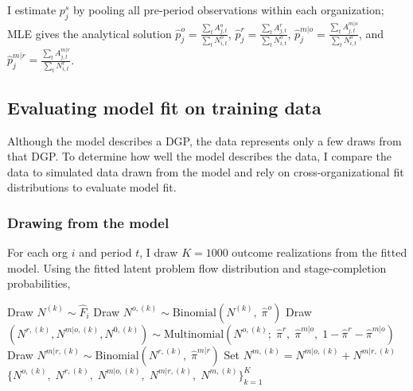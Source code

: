 \documentclass[source/paper/main.tex]{subfiles}
\begin{document}
I estimate $p_j^s$ by pooling all pre-period observations within each organization; MLE gives the analytical solution $\hat{p}_j^o = \frac{\sum_t A_{j,t}^o}{\sum_t N_{i,t}^o}$, $\hat{p}_j^r = \frac{\sum_t A_{j,t}^r}{\sum_t N_{i,t}^o}$, $\hat{p}_j^{m|o} = \frac{\sum_t A_{j,t}^{m|o}}{\sum_t N_{i,t}^o}$, and $\hat{p}_j^{m|r} = \frac{\sum_t A_{j,t}^{m|r}}{\sum_t N_{i,t}^r}$.


\subsection{Evaluating model fit on training data}

Although the model describes a DGP, the data represents only a few draws from that DGP.
To determine how well the model describes the data, I compare the data to simulated data drawn from the model and rely on cross-organizational fit distributions to evaluate model fit.


\subsubsection{Drawing from the model}

For each org $i$ and period $t$, I draw $K=1000$ outcome realizations from the fitted model.
Using the fitted latent problem flow distribution and stage-completion probabilities,

\begin{algorithm}[h]
\caption{DrawCounts($\hat{F}_i,\;\hat{\pi}^o,\;\hat{\pi}^r,\;\hat{\pi}^{m|o},\;\hat{\pi}^{m|r}$)}
\label{alg:drawcounts}
\begin{algorithmic}[1]
  \State Draw $N^{(k)} \sim \hat{F}_i$
  \State Draw $N^{o,(k)} \sim \mathrm{Binomial}(N^{(k)},\;\hat{\pi}^o)$
  \State Draw $(N^{r,(k)},N^{m|o,(k)},N^{0,(k)}) \sim \mathrm{Multinomial}(N^{o,(k)};\;\hat{\pi}^r,\;\hat{\pi}^{m|o},\;1-\hat{\pi}^r-\hat{\pi}^{m|o})$
  \State Draw $N^{m|r,(k)} \sim \mathrm{Binomial}(N^{r,(k)},\;\hat{\pi}^{m|r})$
  \State Set $N^{m,(k)} = N^{m|o,(k)} + N^{m|r,(k)}$
\EndFor
\State \Return $\bigl\{N^{o,(k)},\;N^{r,(k)},\;N^{m|o,(k)},\;N^{m|r,(k)},\;N^{m,(k)}\bigr\}_{k=1}^K$
\end{algorithmic}
\end{algorithm}

\end{document}
